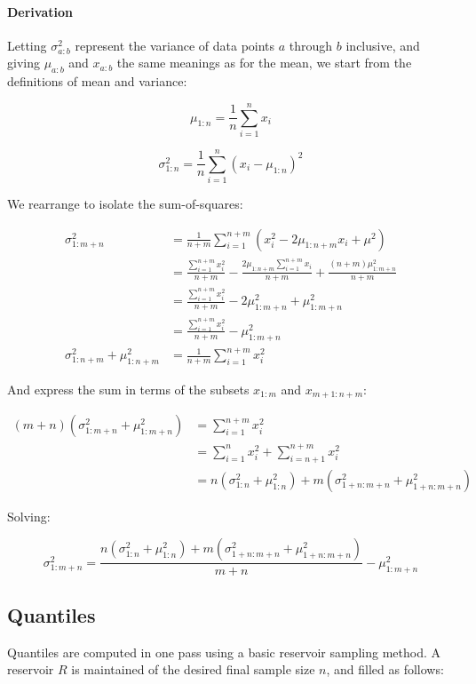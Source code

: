 \documentclass[a4paper]{article}
\begin{document}
\paragraph{Derivation}\label{derivation-1}

Letting \(\sigma_{a:b}^2\) represent the variance of data points \(a\)
through \(b\) inclusive, and giving \(\mu_{a:b}\) and \(x_{a:b}\) the
same meanings as for the mean, we start from the definitions of mean and
variance:

\[\mu_{1:n} = \frac{1}{n} \sum\limits_{i=1}^n x_i\]

\[\sigma_{1:n}^2 = \frac{1}{n} \sum\limits_{i=1}^n (x_i - \mu_{1:n})^2\]

We rearrange to isolate the sum-of-squares:

\[\begin{aligned}\sigma_{1:m+n}^2 &= \frac{1}{n+m} \sum\limits_{i=1}^{n+m} (x_i^2 - 2\mu_{1:n+m}x_i + \mu^2) \\
  &= \frac{\sum\limits_{i=1}^{n+m} x_i^2}{n+m} - \frac{2\mu_{1:n+m}\sum\limits_{i=1}^{n+m} x_i}{n+m} + \frac{(n + m)\mu_{1:m+n}^2}{n+m} \\
  &= \frac{\sum\limits_{i=1}^{n+m} x_i^2}{n+m} - 2\mu_{1:m+n}^2 + \mu_{1:m+n}^2 \\
  &= \frac{\sum\limits_{i=1}^{n+m} x_i^2}{n+m} - \mu_{1:m+n}^2 \\
  \sigma_{1:n+m}^2 + \mu_{1:n+m}^2 &= \frac{1}{n+m} \sum\limits_{i=1}^{n+m} x_i^2\end{aligned}\]

And express the sum in terms of the subsets \(x_{1:m}\) and
\(x_{m+1:n+m}\):

\[\begin{aligned}(m + n)(\sigma_{1:m+n}^2 + \mu_{1:m+n}^2) &= \sum\limits_{i=1}^{n+m} x_i^2 \\
  &= \sum_{i=1}^n x_i^2 + \sum_{i=n+1}^{n+m} x_i^2 \\
  &= n(\sigma^2_{1:n} + \mu_{1:n}^2) + m(\sigma_{1+n:m+n}^2 + \mu_{1+n:m+n}^2)\end{aligned}\]

Solving:

\[\sigma_{1:m+n}^2 = \frac{n(\sigma_{1:n}^2 + \mu_{1:n}^2) + m(\sigma_{1+n:m+n}^2 + \mu_{1+n:m+n}^2)}{m+n} - \mu_{1:m+n}^2\]

\subsection{Quantiles}\label{quantiles}

Quantiles are computed in one pass using a basic reservoir
sampling\cite{vitter1985}\cite[pp.~144-145]{Knuth1997} method. A reservoir \(R\) is maintained of
the desired final sample size \(n\), and filled as follows:
\end{document}
